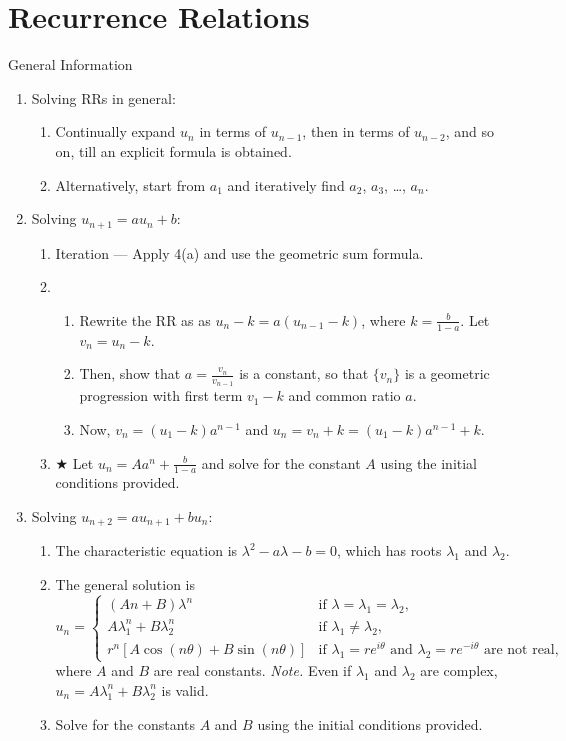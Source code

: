 \documentclass[oneside]{book}
\begin{document}
\chapter{Recurrence Relations}
\begin{stbox}{General Information}{}
  \begin{enumerate}
    \item Solving RRs in general:
    \begin{enumerate}
      \item Continually expand \(u_n\) in terms of \(u_{n-1}\), then in terms of \(u_{n-2}\), and so on, till an explicit formula is obtained.
      \item Alternatively, start from \(a_1\) and iteratively find \(a_2\), \(a_3\), \ldots, \(a_n\).
    \end{enumerate}
    \item Solving \(u_{n+1}=au_{n}+b\):
    \begin{enumerate}
      \item Iteration --- Apply 4(a) and use the geometric sum formula.
      \item
      \begin{enumerate}
        \item Rewrite the RR as as \(u_n-k=a(u_{n-1}-k)\), where \(k=\frac{b}{1-a}\). Let \(v_n=u_n-k\).
        \item Then, show that \(a=\frac{v_n}{v_{n-1}}\) is a constant, so that \(\{v_n\}\) is a geometric progression with first term \(v_1-k\) and common ratio \(a\). 
        \item Now, \(v_n=(u_1-k)a^{n-1}\) and \(u_n=v_n+k=(u_1-k)a^{n-1}+k\).
      \end{enumerate}
      \item \(\bigstar\) Let \(u_n=Aa^n+\frac{b}{1-a}\) and solve for the constant \(A\) using the initial conditions provided.
    \end{enumerate}
    \item Solving \(u_{n+2}=au_{n+1}+bu_n\):
    \begin{enumerate}[label=\roman*.]
      \item The characteristic equation is \(\lambda^2-a\lambda-b=0\), which has roots \(\lambda_1\) and \(\lambda_2\).
      \item The general solution is
      \[u_n=\begin{cases}
        (An+B)\lambda^n &\text{if \(\lambda=\lambda_1=\lambda_2\)},\\
        A\lambda_1^n+B\lambda_2^n &\text{if \(\lambda_1\neq\lambda_2\)},\\
        r^n[A\cos(n\theta)+B\sin(n\theta)] &\text{if \(\lambda_1=re^{i\theta}\) and \(\lambda_2=re^{-i\theta}\) are not real},
      \end{cases}\]
      where \(A\) and \(B\) are real constants. \emph{Note.} Even if \(\lambda_1\) and \(\lambda_2\) are complex, \(u_n=A\lambda_1^n+B\lambda_2^n\) is valid.
      \item Solve for the constants \(A\) and \(B\) using the initial conditions provided.
    \end{enumerate}
  \end{enumerate}
\end{stbox}
\end{document}
